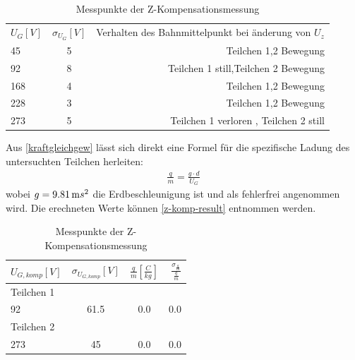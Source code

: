 \documentclass[a4paper,12pt]{article}
\begin{document}
\begin{table}
	\centering
	\begin{tabular}{ l | c | r }
		$U_{G} [V]$ & $\sigma_{U_{G}}[V]$ & Verhalten des Bahnmittelpunkt bei änderung von $U_z$  \\
		45 & 5 & Teilchen 1,2 Bewegung   \\
		92 & 8 & Teilchen 1 still,Teilchen 2 Bewegung \\
		168 & 4 & Teilchen 1,2 Bewegung    \\
		228 & 3 & Teilchen 1,2 Bewegung \\
		273 & 5 & Teilchen 1 verloren , Teilchen 2 still \\
	\end{tabular}
\caption{Messpunkte der Z-Kompensationsmessung}
\label{tab:z-komp-measure}
\end{table}

Aus \ref{kraftgleichgew} lässt sich direkt eine Formel für die spezifische Ladung des untersuchten Teilchen herleiten:
\begin{align*}\label{zspezm}
	\frac{q}{m} = \frac{g \cdot  d}{U_{G}}
\end{align*}
wobei $g = \unit[9.81]{m}{s^2}$ die Erdbeschleunigung ist und als fehlerfrei angenommen wird.
Die erechneten Werte können \ref{z-komp-result} entnommen werden.


\begin{table}
	\centering
	\begin{tabular}{ l | c | c| r }
		$U_{G,komp} [V]$ & $\sigma_{U_{G,komp}}[V]$ & $\frac{q}{m}[\frac{C}{kg}]$ & $\frac{\sigma_{\frac{q}{m}}}{\frac{q}{m}}$  \\
		\hline
		\hline
		Teilchen 1 \\
		92 & 61.5 & 0.0 & 0.0 \\
		\hline
		Teilchen 2 \\
		273 & 45 & 0.0 & 0.0 \\
	\end{tabular}
\caption{Messpunkte der Z-Kompensationsmessung}
\label{tab:z-komp-result}
\end{table}
\end{document}
